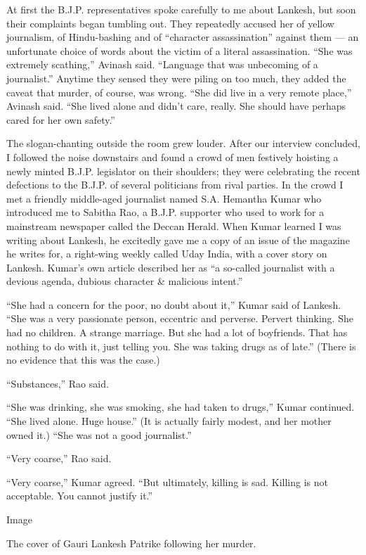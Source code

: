At first the B.J.P. representatives spoke carefully to me about Lankesh,
but soon their complaints began tumbling out. They repeatedly accused
her of yellow journalism, of Hindu-bashing and of ``character
assassination'' against them --- an unfortunate choice of words about
the victim of a literal assassination. ``She was extremely scathing,''
Avinash said. ``Language that was unbecoming of a journalist.'' Anytime
they sensed they were piling on too much, they added the caveat that
murder, of course, was wrong. ``She did live in a very remote place,''
Avinash said. ``She lived alone and didn't care, really. She should have
perhaps cared for her own safety.''

The slogan-chanting outside the room grew louder. After our interview
concluded, I followed the noise downstairs and found a crowd of men
festively hoisting a newly minted B.J.P. legislator on their shoulders;
they were celebrating the recent defections to the B.J.P. of several
politicians from rival parties. In the crowd I met a friendly
middle-aged journalist named S.A. Hemantha Kumar who introduced me to
Sabitha Rao, a B.J.P. supporter who used to work for a mainstream
newspaper called the Deccan Herald. When Kumar learned I was writing
about Lankesh, he excitedly gave me a copy of an issue of the magazine
he writes for, a right-wing weekly called Uday India, with a cover story
on Lankesh. Kumar's own article described her as ``a so-called
journalist with a devious agenda, dubious character \& malicious
intent.''

``She had a concern for the poor, no doubt about it,'' Kumar said of
Lankesh. ``She was a very passionate person, eccentric and perverse.
Pervert thinking. She had no children. A strange marriage. But she had a
lot of boyfriends. That has nothing to do with it, just telling you. She
was taking drugs as of late.'' (There is no evidence that this was the
case.)

``Substances,'' Rao said.

``She was drinking, she was smoking, she had taken to drugs,'' Kumar
continued. ``She lived alone. Huge house.'' (It is actually fairly
modest, and her mother owned it.) ``She was not a good journalist.''

``Very coarse,'' Rao said.

``Very coarse,'' Kumar agreed. ``But ultimately, killing is sad. Killing
is not acceptable. You cannot justify it.''

Image

The cover of Gauri Lankesh Patrike following her murder.

